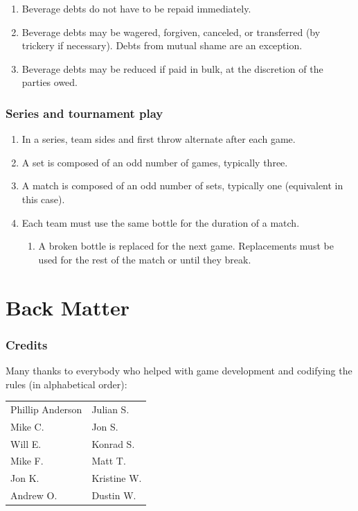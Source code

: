 \documentclass[11pt,letterpaper,twocolumn,english,DIV=calc]{scrartcl}
\begin{document}
\begin{enumerate}[leftmargin=2.8em, label=\thesubsection.\arabic*]
	\item Beverage debts do not have to be repaid immediately.
	\item Beverage debts may be wagered, forgiven, canceled, or transferred (by trickery if necessary). 
	Debts from mutual shame are an exception.
	\item Beverage debts may be reduced if paid in bulk, at the discretion of the parties owed.
\end{enumerate}

\section{Series and tournament play}
\begin{enumerate}[label=\thesection.\arabic*]
	\item In a series, team sides and first throw alternate after each game.
	\item A set is composed of an odd number of games, typically three.
	\item A match is composed of an odd number of sets, typically one (equivalent in this case).
	\item Each team must use the same bottle for the duration of a match.

	\begin{enumerate}
		\item A broken bottle is replaced for the next game. 
		Replacements must be used for the rest of the match or until they break.
	\end{enumerate}
\end{enumerate}

\newpage{}

\part*{Back Matter}

\section*{Credits}

Many thanks to everybody who helped with game development and codifying the rules (in alphabetical order):\medskip{}

\begin{tabular}{>{\raggedright}p{3.5cm}>{\raggedright}p{2.5cm}}
	Phillip Anderson & Julian S.\tabularnewline
	Mike C. & Jon S.\tabularnewline
	Will E. & Konrad S.\tabularnewline
	Mike F. & Matt T.\tabularnewline
	Jon K. & Kristine W.\tabularnewline
	Andrew O. & Dustin W.\tabularnewline
\end{tabular}
\end{document}
